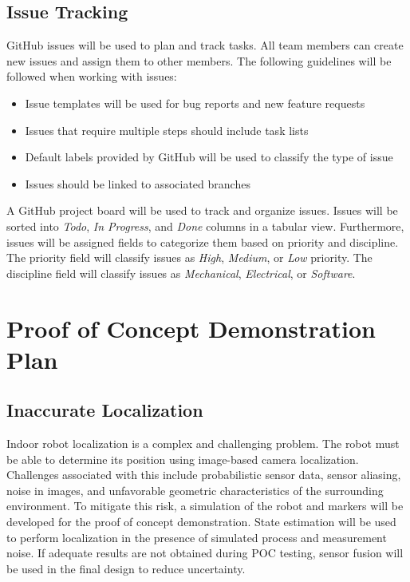 \documentclass[titlepage]{article}
\begin{document}
\subsection{Issue Tracking}

GitHub issues will be used to plan and track tasks. All team members can create new issues and assign them to other members. The following guidelines will be followed when working with issues:

\begin{itemize}
\item Issue templates will be used for bug reports and new feature requests
\item Issues that require multiple steps should include task lists
\item Default labels provided by GitHub will be used to classify the type of issue
\item Issues should be linked to associated branches
\end{itemize}

A GitHub project board will be used to track and organize issues. Issues will be sorted into \textit{Todo}, \textit{In Progress}, and \textit{Done} columns in a tabular view. Furthermore, issues will be assigned fields to categorize them based on priority and discipline. The priority field will classify issues as \textit{High}, \textit{Medium}, or \textit{Low} priority. The discipline field will classify issues as \textit{Mechanical}, \textit{Electrical}, or \textit{Software}.

\section{Proof of Concept Demonstration Plan}

\subsection{Inaccurate Localization}
Indoor robot localization is a complex and challenging problem. The robot must be able to determine its position using image-based camera localization. Challenges associated with this include probabilistic sensor data, sensor aliasing, noise in images, and unfavorable geometric characteristics of the surrounding environment. To mitigate this risk, a simulation of the robot and markers will be developed for the proof of concept demonstration. State estimation will be used to perform localization in the presence of simulated process and measurement noise. If adequate results are not obtained during POC testing, sensor fusion will be used in the final design to reduce uncertainty.
\end{document}
